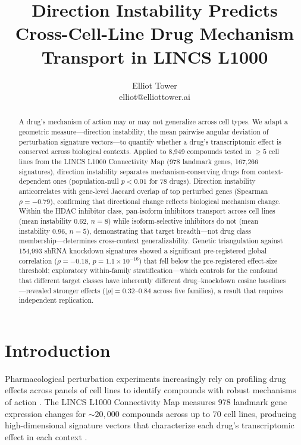 \documentclass{article}
\title{Direction Instability Predicts Cross-Cell-Line Drug Mechanism Transport in LINCS L1000}
\author{\name Elliot Tower \\
      \email elliot@elliottower.ai}
\begin{document}
\maketitle

\begin{abstract}
A drug's mechanism of action may or may not generalize across cell types.
We adapt a geometric measure---direction instability, the mean pairwise
angular deviation of perturbation signature vectors---to quantify whether
a drug's transcriptomic effect is conserved across biological contexts.
Applied to 8{,}949 compounds tested in $\geq5$ cell lines from the LINCS
L1000 Connectivity Map (978 landmark genes, 167{,}266 signatures), direction
instability separates mechanism-conserving drugs from context-dependent ones
(population-null $p<0.01$ for 78 drugs). Direction instability anticorrelates
with gene-level Jaccard overlap of top perturbed genes (Spearman
$\rho=-0.79$), confirming that directional change reflects biological
mechanism change. Within the HDAC inhibitor class, pan-isoform inhibitors
transport across cell lines (mean instability 0.62, $n=8$) while
isoform-selective inhibitors do not (mean instability 0.96, $n=5$),
demonstrating that target breadth---not drug class membership---determines
cross-context generalizability. Genetic triangulation against 154{,}993
shRNA knockdown signatures showed a significant pre-registered global
correlation ($\rho = -0.18$, $p = 1.1 \times 10^{-16}$) that fell below
the pre-registered effect-size threshold; exploratory within-family
stratification---which controls for the confound that different target
classes have inherently different drug--knockdown cosine baselines---revealed
stronger effects ($|\rho| = 0.32$--$0.84$ across five families),
a result that requires independent replication.
\end{abstract}

\section{Introduction}

Pharmacological perturbation experiments increasingly rely on profiling drug
effects across panels of cell lines to identify compounds with robust
mechanisms of action \citep{subramanian2017next}. The LINCS L1000 Connectivity
Map measures 978 landmark gene expression changes for ${\sim}20{,}000$
compounds across up to 70 cell lines, producing high-dimensional signature
vectors that characterize each drug's transcriptomic effect in each context
\citep{subramanian2017next}.
\end{document}

